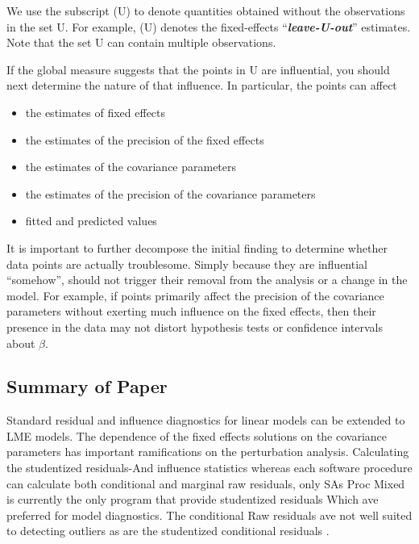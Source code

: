 \documentclass[12pt, a4paper]{article}
\begin{document}
We use the subscript (U) to denote quantities obtained without the observations in the set U. For example,
(U) denotes the fixed-effects “\textit{\textbf{leave-U-out}}” estimates. Note that the set U can contain multiple observations.


If the global measure suggests that the points in U are influential, you should next determine the nature of
that influence. In particular, the points can affect
\begin{itemize}
	\item the estimates of fixed effects
	\item the estimates of the precision of the fixed effects
	\item the estimates of the covariance parameters
	\item the estimates of the precision of the covariance parameters
	\item fitted and predicted values
\end{itemize}

It is important to further decompose the initial finding to determine whether data points are actually troublesome.
Simply because they are influential “somehow”, should not trigger their removal from the analysis or
a change in the model. For example, if points primarily affect the precision of the covariance parameters
without exerting much influence on the fixed effects, then their presence in the data may not distort hypothesis
tests or confidence intervals about $\beta$.

\subsection{Summary of Paper}

Standard residual and influence diagnostics for linear models can be extended to LME models.
The dependence of the fixed effects solutions on the covariance parameters has important ramifications on the perturbation analysis.	
Calculating the studentized residuals-And influence statistics whereas each software procedure can calculate both conditional and marginal raw residuals, only SAs Proc Mixed is currently the only program that provide studentized residuals Which ave preferred for model diagnostics. The conditional Raw residuals ave not well suited to detecting outliers as are the studentized conditional residuals \citep{schabenberger}.
\end{document}
